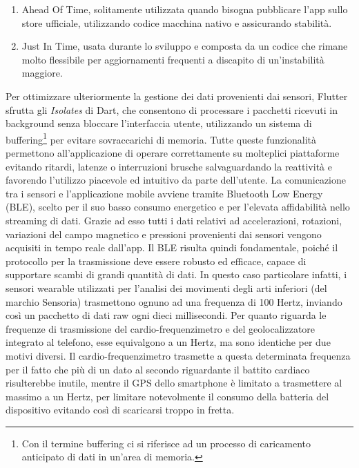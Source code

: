 \documentclass[target=bach,aauheader=,style=]{thud}
\begin{document}
\begin{enumerate}
    \item Ahead Of Time, solitamente utilizzata quando bisogna pubblicare l’app sullo store ufficiale, utilizzando
    codice macchina nativo e assicurando stabilità.
    \item Just In Time, usata durante lo sviluppo e composta da un codice che rimane molto flessibile per aggiornamenti frequenti a discapito di un'instabilità maggiore.
\end{enumerate}
Per ottimizzare ulteriormente la gestione dei dati provenienti dai sensori, Flutter sfrutta gli \textit{Isolates} di Dart, che consentono di processare i pacchetti ricevuti in background senza bloccare l'interfaccia utente, utilizzando un sistema di buffering\footnote{Con il termine buffering ci si riferisce ad un processo di caricamento anticipato di dati in un'area di memoria.} per evitare sovraccarichi di memoria.
Tutte queste funzionalità permettono all’applicazione di operare correttamente su molteplici piattaforme evitando ritardi, latenze o interruzioni brusche salvaguardando la reattività e favorendo l’utilizzo piacevole ed intuitivo da parte dell’utente. La comunicazione tra i sensori e l'applicazione mobile avviene tramite Bluetooth Low Energy (BLE), scelto per il suo basso consumo energetico e per l'elevata affidabilità nello streaming di dati. Grazie ad esso tutti i dati relativi ad accelerazioni, rotazioni, variazioni del campo magnetico e pressioni provenienti dai sensori vengono acquisiti in tempo reale dall'app. Il BLE risulta quindi fondamentale, poiché il protocollo per la trasmissione deve essere robusto ed efficace, capace di supportare scambi di grandi quantità di dati. In questo caso particolare infatti, i sensori wearable utilizzati per l'analisi dei movimenti degli arti inferiori (del marchio Sensoria) trasmettono ognuno ad una frequenza di 100 Hertz, inviando così un pacchetto di dati raw ogni dieci millisecondi. Per quanto riguarda le frequenze di trasmissione del cardio-frequenzimetro e del geolocalizzatore integrato al telefono, esse equivalgono a un Hertz, ma sono identiche per due motivi diversi. Il cardio-frequenzimetro trasmette a questa determinata frequenza per il fatto che più di un dato al secondo riguardante il battito cardiaco risulterebbe inutile, mentre il GPS dello smartphone è limitato a trasmettere al massimo a un Hertz, per limitare notevolmente il consumo della batteria del dispositivo evitando così di scaricarsi troppo in fretta.
\end{document}

